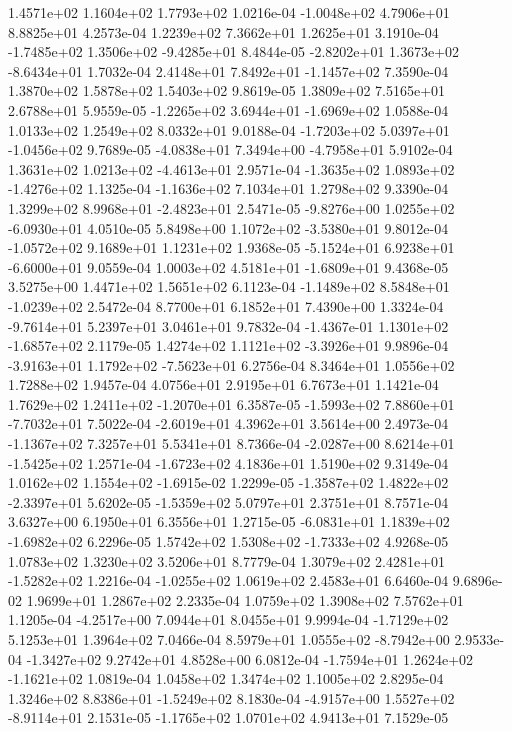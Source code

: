 1.4571e+02 1.1604e+02 1.7793e+02  1.0216e-04
-1.0048e+02  4.7906e+01  8.8825e+01  4.2573e-04
1.2239e+02 7.3662e+01 1.2625e+01  3.1910e-04
-1.7485e+02  1.3506e+02 -9.4285e+01  8.4844e-05
-2.8202e+01  1.3673e+02 -8.6434e+01  1.7032e-04
 2.4148e+01  7.8492e+01 -1.1457e+02  7.3590e-04
1.3870e+02 1.5878e+02 1.5403e+02  9.8619e-05
1.3809e+02 7.5165e+01 2.6788e+01  5.9559e-05
-1.2265e+02  3.6944e+01 -1.6969e+02  1.0588e-04
1.0133e+02 1.2549e+02 8.0332e+01  9.0188e-04
-1.7203e+02  5.0397e+01 -1.0456e+02  9.7689e-05
-4.0838e+01  7.3494e+00 -4.7958e+01  5.9102e-04
 1.3631e+02  1.0213e+02 -4.4613e+01  2.9571e-04
-1.3635e+02  1.0893e+02 -1.4276e+02  1.1325e-04
-1.1636e+02  7.1034e+01  1.2798e+02  9.3390e-04
 1.3299e+02  8.9968e+01 -2.4823e+01  2.5471e-05
-9.8276e+00  1.0255e+02 -6.0930e+01  4.0510e-05
 5.8498e+00  1.1072e+02 -3.5380e+01  9.8012e-04
-1.0572e+02  9.1689e+01  1.1231e+02  1.9368e-05
-5.1524e+01  6.9238e+01 -6.6000e+01  9.0559e-04
 1.0003e+02  4.5181e+01 -1.6809e+01  9.4368e-05
3.5275e+00 1.4471e+02 1.5651e+02  6.1123e-04
-1.1489e+02  8.5848e+01 -1.0239e+02  2.5472e-04
8.7700e+01 6.1852e+01 7.4390e+00  1.3324e-04
-9.7614e+01  5.2397e+01  3.0461e+01  9.7832e-04
-1.4367e-01  1.1301e+02 -1.6857e+02  2.1179e-05
 1.4274e+02  1.1121e+02 -3.3926e+01  9.9896e-04
-3.9163e+01  1.1792e+02 -7.5623e+01  6.2756e-04
8.3464e+01 1.0556e+02 1.7288e+02  1.9457e-04
4.0756e+01 2.9195e+01 6.7673e+01  1.1421e-04
 1.7629e+02  1.2411e+02 -1.2070e+01  6.3587e-05
-1.5993e+02  7.8860e+01 -7.7032e+01  7.5022e-04
-2.6019e+01  4.3962e+01  3.5614e+00  2.4973e-04
-1.1367e+02  7.3257e+01  5.5341e+01  8.7366e-04
-2.0287e+00  8.6214e+01 -1.5425e+02  1.2571e-04
-1.6723e+02  4.1836e+01  1.5190e+02  9.3149e-04
 1.0162e+02  1.1554e+02 -1.6915e-02  1.2299e-05
-1.3587e+02  1.4822e+02 -2.3397e+01  5.6202e-05
-1.5359e+02  5.0797e+01  2.3751e+01  8.7571e-04
3.6327e+00 6.1950e+01 6.3556e+01  1.2715e-05
-6.0831e+01  1.1839e+02 -1.6982e+02  6.2296e-05
 1.5742e+02  1.5308e+02 -1.7333e+02  4.9268e-05
1.0783e+02 1.3230e+02 3.5206e+01  8.7779e-04
 1.3079e+02  2.4281e+01 -1.5282e+02  1.2216e-04
-1.0255e+02  1.0619e+02  2.4583e+01  6.6460e-04
9.6896e-02 1.9699e+01 1.2867e+02  2.2335e-04
1.0759e+02 1.3908e+02 7.5762e+01  1.1205e-04
-4.2517e+00  7.0944e+01  8.0455e+01  9.9994e-04
-1.7129e+02  5.1253e+01  1.3964e+02  7.0466e-04
 8.5979e+01  1.0555e+02 -8.7942e+00  2.9533e-04
-1.3427e+02  9.2742e+01  4.8528e+00  6.0812e-04
-1.7594e+01  1.2624e+02 -1.1621e+02  1.0819e-04
1.0458e+02 1.3474e+02 1.1005e+02  2.8295e-04
 1.3246e+02  8.8386e+01 -1.5249e+02  8.1830e-04
-4.9157e+00  1.5527e+02 -8.9114e+01  2.1531e-05
-1.1765e+02  1.0701e+02  4.9413e+01  7.1529e-05
